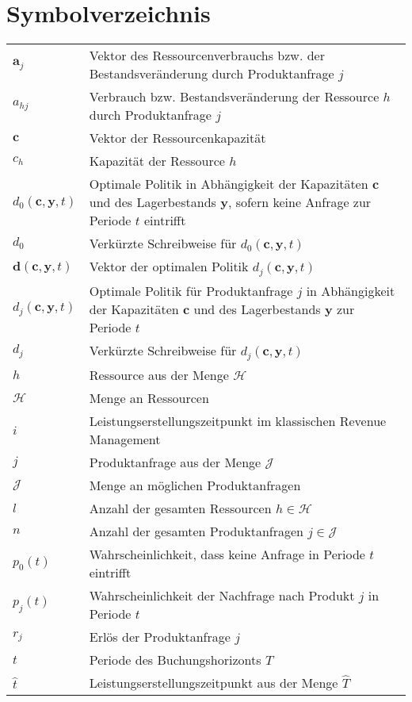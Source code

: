 \documentclass[a4paper,12pt,normalheadings,footexclude,headinclude,liststotoc,nochapterprefix,onecolumn,oneside,parskip,pointlessnumbers]{scrreprt}
\begin{document}
\chapter*{Symbolverzeichnis}
\begin{table}[h!]
    \vspace*{-3mm}
    \hspace*{2mm}
  \renewcommand{\arraystretch}{1,5}
  \begin{flushleft}
    \begin{tabular}{lp{11.5cm}}  %
    $\textbf{a}_{j}$ & Vektor des Ressourcenverbrauchs bzw. der Bestandsveränderung durch Produktanfrage $j$\\
    $a_{hj}$ &	Verbrauch bzw. Bestandsveränderung der Ressource $h$ durch Produkt\-anfrage $j$\\
   $\textbf{c}$ & Vektor der Ressourcenkapazität\\
   $c_{h}$ & Kapazität der Ressource $h$\\
   $d_0(\textbf{c},\textbf{y},t)$ & Optimale Politik in Abhängigkeit der Kapazitäten $\textbf{c}$ und des Lagerbestands \textbf{y}, sofern keine Anfrage zur Periode $t$ eintrifft\\
   $d_0$ & Verkürzte Schreibweise für $d_0(\textbf{c},\textbf{y},t)$ \\
            $\textbf{d}(\textbf{c},\textbf{y},t)$ & Vektor der optimalen Politik $d_j(\textbf{c},\textbf{y},t)$\\
      $d_j(\textbf{c},\textbf{y},t)$ & Optimale Politik für Produktanfrage $j$ in Abhängigkeit der Kapazitäten $\textbf{c}$ und des Lagerbestands \textbf{y} zur Periode $t$\\
      $d_j$ & Verkürzte Schreibweise für $d_j(\textbf{c},\textbf{y},t)$\\
    $h$	& Ressource aus der Menge $\mathcal{H}$\\
    $\mathcal{H}$ & Menge an Ressourcen\\
    $i$ & Leistungserstellungszeitpunkt im klassischen Revenue Management\\
    $j$ & Produktanfrage aus der Menge $\mathcal{J}$\\
$\mathcal{J}$ & Menge an möglichen Produktanfragen \\   
$l$ & Anzahl der gesamten Ressourcen $h\in\mathcal{H}$\\
$n$ & Anzahl der gesamten Produktanfragen $j\in\mathcal{J}$\\
   $p_{0}(t)$ & Wahrscheinlichkeit, dass keine Anfrage in Periode $t$ eintrifft\\
   $p_{j}(t)$ & Wahrscheinlichkeit der Nachfrage nach Produkt $j$ in Periode $t$\\
    $r_{j}$ & Erlös der Produktanfrage $j$\\
            $t$ & Periode des Buchungshorizonts $T$\\
    $\hat t$ & Leistungserstellungszeitpunkt aus der Menge $\hat T$\\
	\end{tabular}
	\end{flushleft}
\end{table}
\end{document}
